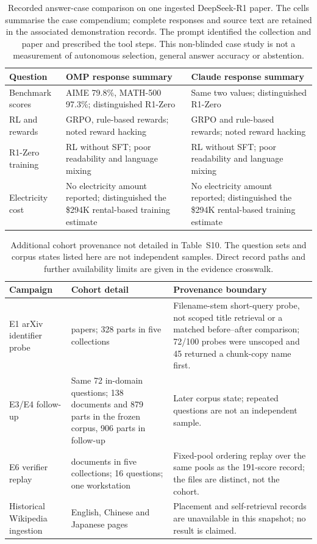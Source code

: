 \documentclass[final,5p,times,twocolumn]{elsarticle}
\begin{document}
\begin{table}[t]
\centering\small
\caption{Recorded answer-case comparison on one ingested DeepSeek-R1 paper.
The cells summarise the case compendium; complete responses and source text
are retained in the associated demonstration records. The prompt identified
the collection and paper and prescribed the tool steps. This non-blinded case
study is not a measurement of autonomous selection, general answer accuracy or
abstention.}
\label{tab:s-answer-cases}
\begin{tabular}{@{}p{}p{}p{}@{}}
\toprule
Question & OMP response summary & Claude response summary \\
\midrule
Benchmark scores & AIME 79.8\%, MATH-500 97.3\%; distinguished R1-Zero & Same two values; distinguished R1-Zero \\
RL and rewards & GRPO, rule-based rewards; noted reward hacking & GRPO and rule-based rewards; noted reward hacking \\
R1-Zero training & RL without SFT; poor readability and language mixing & RL without SFT; poor readability and language mixing \\
Electricity cost & No electricity amount reported; distinguished the \$294K rental-based training estimate & No electricity amount reported; distinguished the \$294K rental-based training estimate \\
\bottomrule
\end{tabular}
\end{table}
\begin{table}[t]
\centering
\footnotesize
\setlength{\tabcolsep}{4pt}
\caption{Additional cohort provenance not detailed in Table~S10. The
question sets and corpus states listed here are not independent samples.
Direct record paths and further availability limits are given in the evidence
crosswalk.}
\label{tab:eval-design}
\begin{tabular}{@{}>{\raggedright\arraybackslash}p{}>{\raggedright\arraybackslash}p{}>{\raggedright\arraybackslash}p{}@{}}
\toprule
Campaign & Cohort detail & Provenance boundary \\
\midrule
E1 arXiv identifier probe & 100 papers; 328 parts in five collections & Filename-stem short-query probe, not scoped title retrieval or a matched before--after comparison; 72/100 probes were unscoped and 45 returned a chunk-copy name first. \\
E3/E4 follow-up & Same 72 in-domain questions; 138 documents and 879 parts in the frozen corpus, 906 parts in follow-up & Later corpus state; repeated questions are not an independent sample. \\
E6 verifier replay & 42 documents in five collections; 16 questions; one workstation & Fixed-pool ordering replay over the same pools as the 191-score record; the files are distinct, not the cohort. \\
Historical Wikipedia ingestion & English, Chinese and Japanese pages & Placement and self-retrieval records are unavailable in this snapshot; no result is claimed. \\
\bottomrule
\end{tabular}
\end{table}
\end{document}
